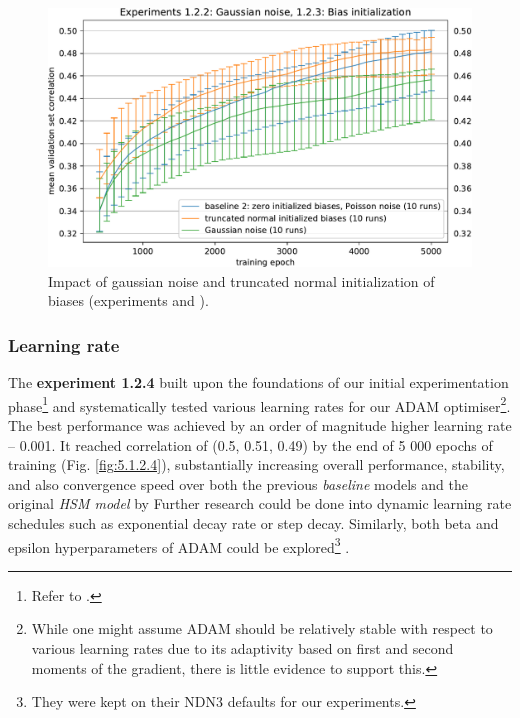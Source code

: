 \begin{figure}[H]
    \centering
    \includegraphics[width=1\textwidth]{../figures/05_1_2_2}
    \caption[Experiments 1.2.2 and 1.2.3]{Impact of gaussian noise and truncated normal initialization of biases (experiments  and ).}
    \label{fig:5.1.2.2}
\end{figure}

\subsubsection{Learning rate}\label{ex:1.2.4}

The \textbf{experiment 1.2.4} built upon the foundations of our initial experimentation phase\footnote{Refer to .} and systematically tested various learning rates for our ADAM optimiser\footnote{While one might assume ADAM should be relatively stable with respect to various learning rates due to its adaptivity based on first and second moments of the gradient, there is little evidence to support this.}. The best performance was achieved by an order of magnitude higher learning rate -- 0.001. It reached correlation of (0.5, 0.51, 0.49) by the end of 5 000 epochs of training (Fig. \ref{fig:5.1.2.4}), substantially increasing overall performance, stability, and also convergence speed over both the previous \textit{baseline} models and the original \textit{HSM model} by \citeauthor{antolik} Further research could be done into dynamic learning rate schedules such as exponential decay rate or step decay. Similarly, both beta and epsilon hyperparameters of ADAM could be explored\footnote{They were kept on their NDN3 defaults for our experiments.} \citep{2019arXiv191005446C}.


